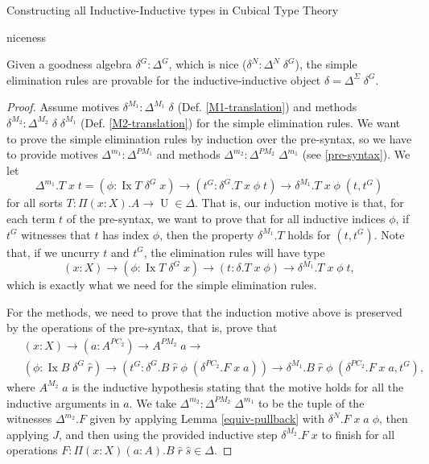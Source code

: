 \documentclass[runningheads]{llncs}
\DeclareMathOperator{\UU}{U}
\DeclareMathOperator{\Ix}{Ix}
\begin{document}
{\begin{section}{Constructing all Inductive-Inductive types in Cubical Type Theory}
\begin{subsection}{niceness}
\begin{lemma}
Given a goodness algebra $\delta^G : \Delta^G$, which is nice ($\delta^N : \Delta^N\;\delta^G$), the simple elimination rules are provable for the inductive-inductive object $\delta = \Delta^\Sigma\;\delta^G$.
\end{lemma}
\begin{proof}
Assume motives $\delta^{M_1} : \Delta^{M_1}\;\delta$ (Def. \ref{M1-translation}) and methods $\delta^{M_2} : \Delta^{M_2}\;\delta\;\delta^{M_1}$ (Def. \ref{M2-translation}) for the simple elimination rules. We want to prove the simple elimination rules by induction over the pre-syntax, so we have to provide motives $\Delta^{m_1} : \Delta^{PM_1}$ and methods $\Delta^{m_2} : \Delta^{PM_2}\;\Delta^{m_1}$ (see \ref{pre-syntax}).
We let \[\Delta^{m_1}.T\;x\;t = (\phi : \Ix T \;\delta^G\;x) \to (t^G : \delta^G.T\;x\;\phi\;t) \to \delta^{M_1}.T\;x\;\phi\;(t , t^G)\] for all sorts $T : \Pi(x : X).A \to \UU\in\Delta$. That is, our induction motive is that, for each term $t$ of the pre-syntax, we want to prove that for all inductive indices $\phi$, if $t^G$ witnesses that $t$ has index $\phi$, then the property $\delta^{M_1}.T$ holds for $(t, t^G)$. Note that, if we uncurry $t$ and $t^G$, the elimination rules will have type \[(x : X) \to (\phi: \Ix T\;\delta^G\;x) \to (t : \delta.T\;x\;\phi) \to \delta^{M_1}.T\;x\;\phi\;t,\] which is exactly what we need for the simple elimination rules.

For the methods, we need to prove that the induction motive above is preserved by the operations of the pre-syntax, that is, prove that \begin{align*}&\; (x : X)\to (a : A^{PC_2}) \to A^{PM_2}\;a \to \\&\; (\phi : \Ix B \;\delta^G\;\hat{r}) \to (t^G : \delta^G.B\;\hat{r}\;\phi\;(\delta^{PC_2}.F\;x\;a)) \to \delta^{M_1}.B\;\hat{r}\;\phi\;(\delta^{PC_2}.F\;x\;a , t^G),\end{align*} where $A^{M_2}\;a$ is the inductive hypothesis stating that the motive holds for all the inductive arguments in $a$. We take $\Delta^{m_2} : \Delta^{PM_2}\;\Delta^{m_1}$ to be the tuple of the witnesses $\Delta^{m_2}.F$ given by applying Lemma \ref{equiv-pullback} with $\delta^N.F\;x\;a\;\phi$, then applying $J$, and then using the provided inductive step $\delta^{M_2}.F\;x$ to finish for all operations $F : \Pi(x : X)(a : A).B\;\hat{r}\;\hat{s}\in\Delta$.


\end{proof}
\end{subsection}
\end{section}}
\end{document}
